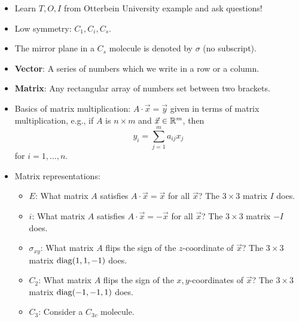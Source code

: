 \documentclass[../notes.tex]{subfiles}
\begin{document}
\begin{itemize}
\begin{itemize}
    \end{itemize}
    \item Learn $T,O,I$ from Otterbein University example and ask questions!
    \item Low symmetry: $C_1,C_i,C_s$.
    \item The mirror plane in a $C_s$ molecule is denoted by $\sigma$ (no subscript).
    \item \textbf{Vector}: A series of numbers which we write in a row or a column.
    \item \textbf{Matrix}: Any rectangular array of numbers set between two brackets.
    \item Basics of matrix multiplication: $A\cdot\vec{x}=\vec{y}$ given in terms of matrix multiplication, e.g., if $A$ is $n\times m$ and $\vec{x}\in\mathbb{R}^m$, then
    \begin{equation*}
        y_i = \sum_{j=1}^ma_{ij}x_j
    \end{equation*}
    for $i=1,\dots,n$.
    \item Matrix representations:
    \begin{itemize}
        \item $E$: What matrix $A$ satisfies $A\cdot\vec{x}=\vec{x}$ for all $\vec{x}$? The $3\times 3$ matrix $I$ does.
        \item $i$: What matrix $A$ satisfies $A\cdot\vec{x}=-\vec{x}$ for all $\vec{x}$? The $3\times 3$ matrix $-I$ does.
        \item $\sigma_{xy}$: What matrix $A$ flips the sign of the $z$-coordinate of $\vec{x}$? The $3\times 3$ matrix $\operatorname{diag}(1,1,-1)$ does.
        \item $C_2$: What matrix $A$ flips the sign of the $x,y$-coordinates of $\vec{x}$? The $3\times 3$ matrix $\operatorname{diag}(-1,-1,1)$ does.
        \item $C_3$: Consider a $C_{3v}$ molecule.
        \begin{figure}[H]
            \centering
\end{figure}
\end{itemize}
\end{itemize}
\end{document}
